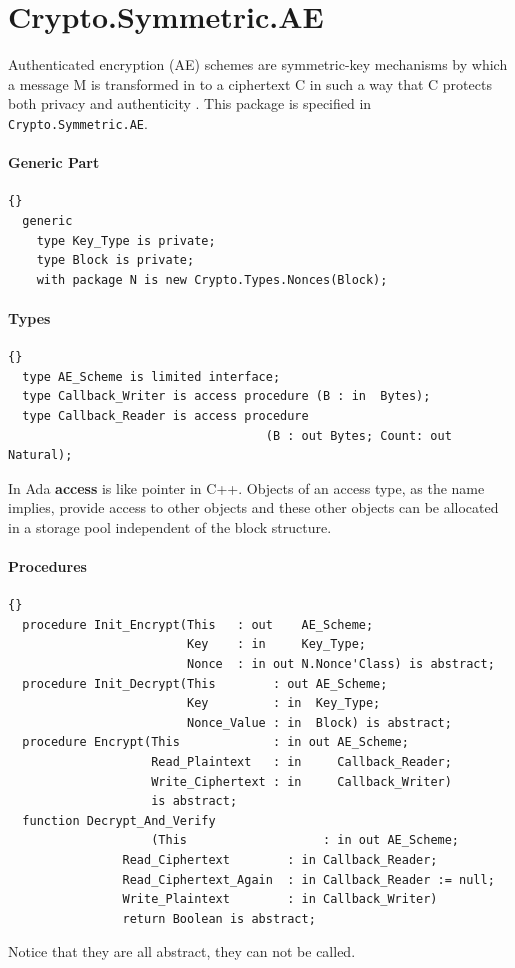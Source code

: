 \chapter{Crypto.Symmetric.AE}\label{AE}
Authenticated encryption (AE) schemes are symmetric-key mechanisms by
which a message M is transformed in to a ciphertext C in such a way
that C protects both privacy and authenticity
\cite{DBLP:journals/iacr/BellareRW03}. This package is specified in
\texttt{Crypto.Symmetric.AE}.
\subsubsection*{Generic Part}
\begin{lstlisting}{}
  generic
    type Key_Type is private;
    type Block is private;
    with package N is new Crypto.Types.Nonces(Block);
\end{lstlisting}
\subsubsection*{Types}
\begin{lstlisting}{}
  type AE_Scheme is limited interface;
  type Callback_Writer is access procedure (B : in  Bytes);
  type Callback_Reader is access procedure
  									(B : out Bytes; Count: out Natural);
\end{lstlisting}
In Ada \textbf{access} is like pointer in C++. Objects of an access
type, as the name implies, provide access to other objects and these
other objects can be allocated in a storage pool independent of the
block structure.

\subsubsection*{Procedures}
\begin{lstlisting}{}
  procedure Init_Encrypt(This   : out    AE_Scheme;
                         Key    : in     Key_Type;
                         Nonce  : in out N.Nonce'Class) is abstract;
  procedure Init_Decrypt(This        : out AE_Scheme;
                         Key         : in  Key_Type;
                         Nonce_Value : in  Block) is abstract;
  procedure Encrypt(This             : in out AE_Scheme;
                    Read_Plaintext   : in     Callback_Reader;
                    Write_Ciphertext : in     Callback_Writer) 
                    is abstract;
  function Decrypt_And_Verify
  					(This                   : in out AE_Scheme;
                Read_Ciphertext        : in Callback_Reader;
                Read_Ciphertext_Again  : in Callback_Reader := null;
                Write_Plaintext        : in Callback_Writer)
                return Boolean is abstract;
\end{lstlisting}
Notice that they are all abstract, they can not be called.

